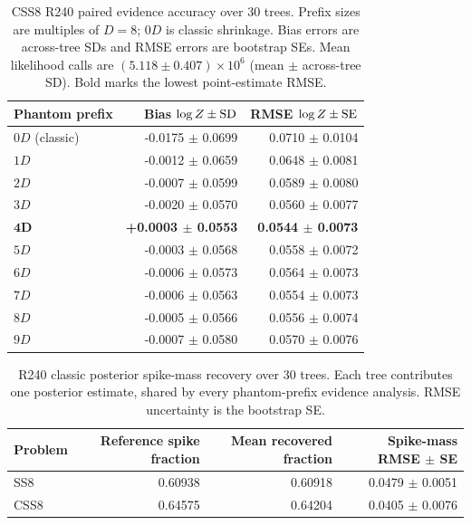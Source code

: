 \documentclass[pdflatex,sn-basic,icol]{sn-jnl}
\theoremstyle{plain}
\theoremstyle{definition}
\begin{document}
\begin{table}[t]
\caption{CSS8 R240 paired evidence accuracy over 30 trees. Prefix sizes are multiples of $D=8$; $0D$ is classic shrinkage. Bias errors are across-tree SDs and RMSE errors are bootstrap SEs. Mean likelihood calls are $(5.118\pm0.407)\times10^6$ (mean $\pm$ across-tree SD). Bold marks the lowest point-estimate RMSE.}
\label{tab:phantom_evidence_css8}
\centering
\scriptsize
\begin{tabular}{lrr}
\toprule
Phantom prefix & Bias $\log Z\mathbin{\pm}{\rm SD}$ & RMSE $\log Z\mathbin{\pm}{\rm SE}$ \\
\midrule
$0D$ (classic) & -0.0175 $\pm$ 0.0699 & 0.0710 $\pm$ 0.0104 \\
$1D$ & -0.0012 $\pm$ 0.0659 & 0.0648 $\pm$ 0.0081 \\
$2D$ & -0.0007 $\pm$ 0.0599 & 0.0589 $\pm$ 0.0080 \\
$3D$ & -0.0020 $\pm$ 0.0570 & 0.0560 $\pm$ 0.0077 \\
$\boldsymbol{4D}$ & \textbf{+0.0003 $\pm$ 0.0553} & \textbf{0.0544 $\pm$ 0.0073} \\
$5D$ & -0.0003 $\pm$ 0.0568 & 0.0558 $\pm$ 0.0072 \\
$6D$ & -0.0006 $\pm$ 0.0573 & 0.0564 $\pm$ 0.0073 \\
$7D$ & -0.0006 $\pm$ 0.0563 & 0.0554 $\pm$ 0.0073 \\
$8D$ & -0.0005 $\pm$ 0.0566 & 0.0556 $\pm$ 0.0074 \\
$9D$ & -0.0007 $\pm$ 0.0580 & 0.0570 $\pm$ 0.0076 \\
\bottomrule
\end{tabular}
\end{table}

\begin{table}[t]
\caption{R240 classic posterior spike-mass recovery over 30 trees. Each tree contributes one posterior estimate, shared by every phantom-prefix evidence analysis. RMSE uncertainty is the bootstrap SE.}
\label{tab:r240_mode_mass}
\centering
\begin{tabular}{lrrr}
\toprule
Problem & Reference spike fraction & Mean recovered fraction & Spike-mass RMSE $\pm$ SE \\
\midrule
SS8 & 0.60938 & 0.60918 & 0.0479 $\pm$ 0.0051 \\
CSS8 & 0.64575 & 0.64204 & 0.0405 $\pm$ 0.0076 \\
\bottomrule
\end{tabular}
\end{table}
\end{document}

